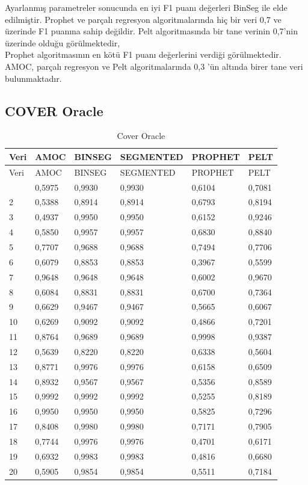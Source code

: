 \documentclass[12pt,twoside]{deuthesis}
\begin{document}
Ayarlanmış parametreler sonucunda en iyi F1 puanı değerleri BinSeg ile elde edilmiştir. Prophet ve parçalı regresyon algoritmalarında hiç bir veri 0,7 ve üzerinde F1 puanına sahip değildir. Pelt algoritmasında bir tane verinin 0,7'nin üzerinde olduğu görülmektedir,\\
Prophet algoritmasının en kötü F1 puanı değerlerini verdiği görülmektedir. AMOC, parçalı regresyon ve Pelt algoritmalarında 0,3 'ün altında birer tane veri bulunmaktadır.

\hypertarget{cover-oracle}{%
\subsection{COVER Oracle}\label{cover-oracle}}

\begin{longtable}[]{@{}llllll@{}}
\caption{\label{tab:nvar10} Cover Oracle}\tabularnewline
\toprule\noalign{}
Veri & AMOC & BINSEG & SEGMENTED & PROPHET & PELT \\
\midrule\noalign{}
\endfirsthead
\toprule\noalign{}
Veri & AMOC & BINSEG & SEGMENTED & PROPHET & PELT \\
\midrule\noalign{}
\endhead
\bottomrule\noalign{}
\endlastfoot
1 & 0,5975 & 0,9930 & 0,9930 & 0,6104 & 0,7081 \\
2 & 0,5388 & 0,8914 & 0,8914 & 0,6793 & 0,8194 \\
3 & 0,4937 & 0,9950 & 0,9950 & 0,6152 & 0,9246 \\
4 & 0,5850 & 0,9957 & 0,9957 & 0,6830 & 0,8840 \\
5 & 0,7707 & 0,9688 & 0,9688 & 0,7494 & 0,7706 \\
6 & 0,6079 & 0,8853 & 0,8853 & 0,3967 & 0,5599 \\
7 & 0,9648 & 0,9648 & 0,9648 & 0,6002 & 0,9670 \\
8 & 0,6084 & 0,8831 & 0,8831 & 0,6700 & 0,7364 \\
9 & 0,6629 & 0,9467 & 0,9467 & 0,5665 & 0,6067 \\
10 & 0,6269 & 0,9092 & 0,9092 & 0,4866 & 0,7201 \\
11 & 0,8764 & 0,9689 & 0,9689 & 0,9998 & 0,9387 \\
12 & 0,5639 & 0,8220 & 0,8220 & 0,6338 & 0,5604 \\
13 & 0,8771 & 0,9976 & 0,9976 & 0,6158 & 0,6509 \\
14 & 0,8932 & 0,9567 & 0,9567 & 0,5356 & 0,8589 \\
15 & 0,9992 & 0,9992 & 0,9992 & 0,5255 & 0,8189 \\
16 & 0,9950 & 0,9950 & 0,9950 & 0,5825 & 0,7296 \\
17 & 0,8408 & 0,9980 & 0,9980 & 0,7171 & 0,7905 \\
18 & 0,7744 & 0,9976 & 0,9976 & 0,4701 & 0,6171 \\
19 & 0,6932 & 0,9983 & 0,9983 & 0,4816 & 0,6680 \\
20 & 0,5905 & 0,9854 & 0,9854 & 0,5511 & 0,7184 \\
\end{longtable}
\end{document}
